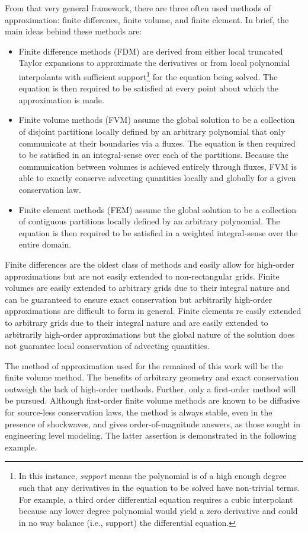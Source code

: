 \documentclass[12pt]{../UWMadThesis}
\begin{document}
From that very general framework, there are three often used methods of approximation: finite difference, finite volume, and finite element.
In brief, the main ideas behind these methods are:
\begin{itemize}[topsep=-0.5\parskip]
	\item{Finite difference methods (FDM) are derived from either local truncated Taylor expansions to approximate the derivatives or from local polynomial interpolants with sufficient support\footnote{In this instance, \emph{support} means the polynomial is of a high enough degree such that any derivatives in the equation to be solved have non-trivial terms.  For example, a third order differential equation requires a cubic interpolant because any lower degree polynomial would yield a zero derivative and could in no way balance (i.e., support) the differential equation.} for the equation being solved. The equation is then required to be satisfied at every point about which the approximation is made.}
    \item{Finite volume methods (FVM) assume the global solution to be a collection of disjoint partitions locally defined by an arbitrary polynomial that only communicate at their boundaries via a fluxes. The equation is then required to be satisfied in an integral-sense over each of the partitions. Because the communication between volumes is achieved entirely through fluxes, FVM is able to exactly conserve advecting quantities locally and globally for a given conservation law.}
    \item{Finite element methods (FEM) assume the global solution to be a collection of contiguous partitions locally defined by an arbitrary polynomial. The equation is then required to be satisfied in a weighted integral-sense over the entire domain.}
\end{itemize}
Finite differences are the oldest class of methods and easily allow for high-order approximations but are not easily extended to non-rectangular grids.
Finite volumes are easily extended to arbitrary grids due to their integral nature and can be guaranteed to ensure exact conservation but arbitrarily high-order approximations are difficult to form in general.
Finite elements re easily extended to arbitrary grids due to their integral nature and are easily extended to arbitrarily high-order approximations but the global nature of the solution does not guarantee local conservation of advecting quantities.

The method of approximation used for the remained of this work will be the finite volume method.
The benefits of arbitrary geometry and exact conservation outweigh the lack of high-order methods.
Further, only a first-order method will be pursued.
Although first-order finite volume methods are known to be diffusive for source-less conservation laws, the method is always stable, even in the presence of shockwaves, and gives order-of-magnitude answers, as those sought in engineering level modeling.
The latter assertion is demonstrated in the following example.
\end{document}

